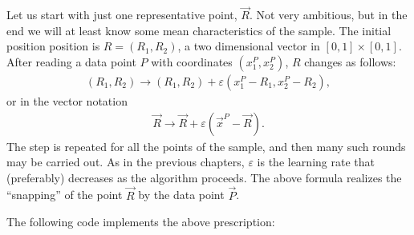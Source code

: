 \documentclass[letterpaper,10pt,english]{jupyterBook}
\begin{document}
\sphinxAtStartPar
Let us start with just one representative point, \(\vec{R}\). Not very ambitious, but in the end we will at least know some mean characteristics of the sample. The initial position  position is \( R=(R_1, R_2) \), a two dimensional vector in \([0,1]\times [0,1]\). After reading a data point \(P\) with coordinates \( (x_1 ^ P, x_2 ^ P) \), \(R\) changes as follows:
\begin{equation*}
\begin{split} (R_1, R_2) \to (R_1, R_2) + \varepsilon (x_1 ^P-R_1, x_2 ^P-R_2), \end{split}
\end{equation*}
\sphinxAtStartPar
or in the vector notation
\begin{equation*}
\begin{split} \vec {R} \to \vec {R} + \varepsilon (\vec {x}^P - \vec {R}). \end{split}
\end{equation*}
\sphinxAtStartPar
The step is repeated for all the points of the sample, and then many such rounds may be carried out. As in the previous chapters, \( \varepsilon \) is the learning rate that (preferably) decreases
as the algorithm proceeds. The above formula realizes the “snapping” of the point \(\vec{R}\) by the data point \(\vec{P}\).

\sphinxAtStartPar
The following code implements the above prescription:
\end{document}
